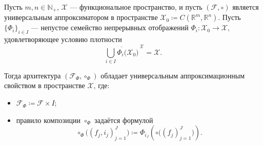 \documentclass[../NDCNNAI_main.tex]{subfiles}
\begin{document}
\begin{theorem}
\label{thm:universal_by_transformation}
Пусть $m,n\in\mathbb{N}_+$,
$\mathcal{X}$ --- функциональное пространство,
и пусть $(\mathcal{F},\circ)$ является универсальным аппроксиматором
в пространстве $\mathcal{X}_0 \coloneq C(\mathbb{R}^m,\mathbb{R}^n)$.
Пусть $\{\Phi_i\}_{i\in I}$ --- непустое семейство непрерывных отображений $\Phi_i\colon \mathcal{X}_0 \longrightarrow \mathcal{X}$,
удовлетворяющее условию плотности
\begin{equation}
\label{eq:dense_union_transform}
\overline{
\bigcup_{i\in I}
\Phi_i\bigl(\mathcal{X}_0\bigr)
}^{\,\mathcal{X}}
=
\mathcal{X}.
\end{equation}

Тогда архитектура $(\mathcal{F}_{\Phi},\circ_{\Phi})$ обладает универсальным
аппроксимационным свойством в пространстве $\mathcal{X}$, где:
\begin{itemize}
\item $\mathcal{F}_{\Phi} \coloneq \mathcal{F} \times I$;
\item правило композиции $\circ_{\Phi}$ задаётся формулой
\[
\circ_{\Phi}\bigl((f_j,i_j)_{j=1}^J\bigr)
\coloneq
\Phi_{i_J}\!\left(
\circ\bigl((f_j)_{j=1}^J\bigr)
\right).
\]
\end{itemize}
\end{theorem}
\end{document}
